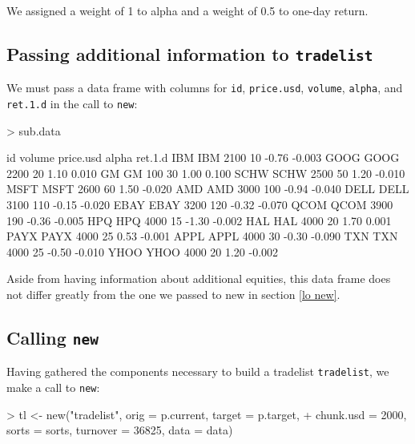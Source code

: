 \documentclass{article}
\begin{document}
We assigned a weight of 1 to alpha and a weight
of 0.5 to one-day return.

\subsection{Passing additional information to \texttt{tradelist}}

We must pass a data frame with columns for \texttt{id},
\texttt{price.usd}, \texttt{volume}, \texttt{alpha}, and
\texttt{ret.1.d} in the call to \texttt{new}:


\begin{Schunk}
\begin{Sinput}
> sub.data
\end{Sinput}
\begin{Soutput}
       id volume price.usd alpha ret.1.d
IBM   IBM   2100        10 -0.76  -0.003
GOOG GOOG   2200        20  1.10   0.010
GM     GM    100        30  1.00   0.100
SCHW SCHW   2500        50  1.20  -0.010
MSFT MSFT   2600        60  1.50  -0.020
AMD   AMD   3000       100 -0.94  -0.040
DELL DELL   3100       110 -0.15  -0.020
EBAY EBAY   3200       120 -0.32  -0.070
QCOM QCOM   3900       190 -0.36  -0.005
HPQ   HPQ   4000        15 -1.30  -0.002
HAL   HAL   4000        20  1.70   0.001
PAYX PAYX   4000        25  0.53  -0.001
APPL APPL   4000        30 -0.30  -0.090
TXN   TXN   4000        25 -0.50  -0.010
YHOO YHOO   4000        20  1.20  -0.002
\end{Soutput}
\end{Schunk}

Aside from having information about additional equities, this data
frame does not differ greatly from the one we passed to new in section
\ref{lo new}.

\subsection{Calling \texttt{new}}
\label{ls new}

Having gathered the components necessary to build a tradelist
\texttt{tradelist}, we make a call to \texttt{new}:

\begin{Schunk}
\begin{Sinput}
> tl <- new("tradelist", orig = p.current, target = p.target, 
+     chunk.usd = 2000, sorts = sorts, turnover = 36825, data = data)
\end{Sinput}
\end{Schunk}
\end{document}
